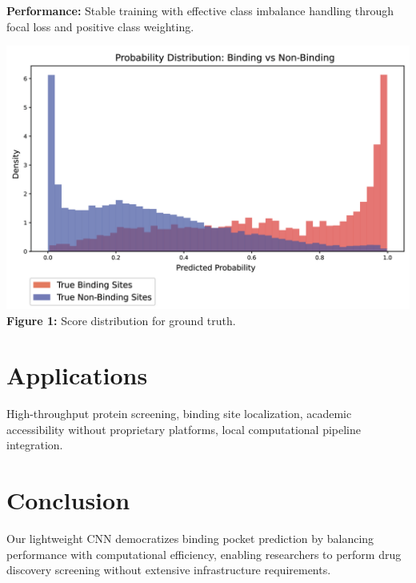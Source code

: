 \documentclass[11pt,a4paper]{article}
\begin{document}
\begin{multicols}{2}
\textbf{Performance:} Stable training with effective class imbalance handling through focal loss and positive class weighting.

\begin{center}
\includegraphics[width=1\columnwidth]{fig1mod.png}
\\[0.1cm]
\textbf{Figure 1:} Score distribution for ground truth.
\end{center}

\section{Applications}

High-throughput protein screening, binding site localization, academic accessibility without proprietary platforms, local computational pipeline integration.

\section{Conclusion}

Our lightweight CNN democratizes binding pocket prediction by balancing performance with computational efficiency, enabling researchers to perform drug discovery screening without extensive infrastructure requirements.

\end{multicols}

\vfill
\end{document}
